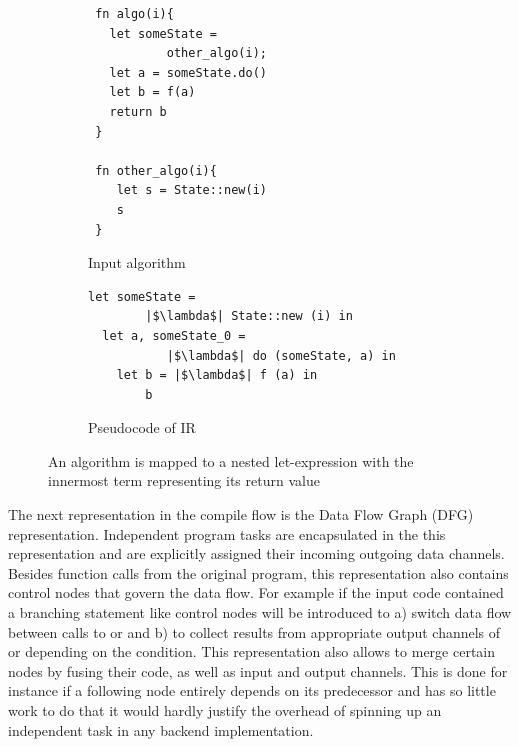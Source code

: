 \begin{figure}
    \centering
    \begin{subfigure}[b]{0.45\textwidth}
         \centering
         \begin{verbatim}
 fn algo(i){
   let someState = 
           other_algo(i);
   let a = someState.do()
   let b = f(a)
   return b
 }

 fn other_algo(i){
    let s = State::new(i)
    s
 }
            \end{verbatim}
         \caption{Input algorithm}
         \label{simplPyInput}
     \end{subfigure}
     \hfill
     \begin{subfigure}[b]{0.5\textwidth}
         \centering
         \begin{verbatim}
let someState = 
        |$\lambda$| State::new (i) in
  let a, someState_0 = 
           |$\lambda$| do (someState, a) in
    let b = |$\lambda$| f (a) in
        b
        \end{verbatim}
        \vspace{15mm}
    \caption{Pseudocode of IR}
         \label{simplIR}
    \end{subfigure}
\caption{An algorithm is mapped to a nested let-expression with the innermost term representing its return value}
\label{fig:funBodyTranslation}
\end{figure}

The next representation in the compile flow is the Data Flow Graph (DFG) representation. Independent program tasks are encapsulated in the this representation and are explicitly assigned their incoming outgoing data channels. Besides function calls from the original program, this representation also contains control nodes that govern the data flow. For example if the input code contained a branching statement like  control nodes will be introduced to a) switch data flow between calls to  or  and b) to collect results from appropriate output channels of  or  depending on the condition. This representation also allows to merge certain nodes by fusing their code, as well as input and output channels. This is done for instance if a following node entirely depends on its predecessor and has so little work to do that it would hardly justify the overhead of spinning up an independent task in any backend implementation.\\

